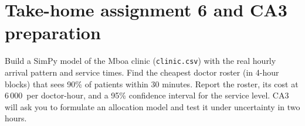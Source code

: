 \section{Take-home assignment 6 and CA3 preparation}
Build a SimPy model of the Mboa clinic (\texttt{clinic.csv}) with the real hourly arrival pattern and service times.
Find the cheapest doctor roster (in 4-hour blocks) that sees 90\% of patients within 30 minutes. Report the roster,
its cost at 6\,000\xaf\ per doctor-hour, and a 95\% confidence interval for the service level. CA3 will ask you to
formulate an allocation model and test it under uncertainty in two hours.
